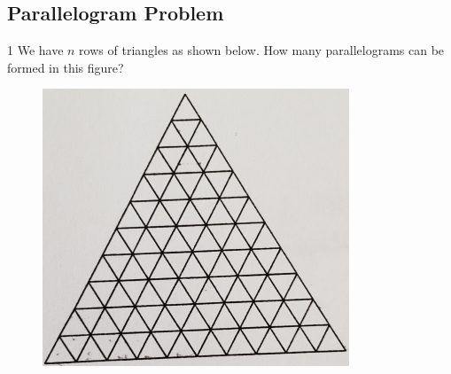 \subsection{Parallelogram Problem}
\begin{problem}
	1 We have $n$ rows of triangles as shown below. How many parallelograms can be formed in this figure?
\end{problem}
\begin{figure}[h]
\includegraphics[scale=1]{figures/TRIANGLE22.png}
\centering
\end{figure}
